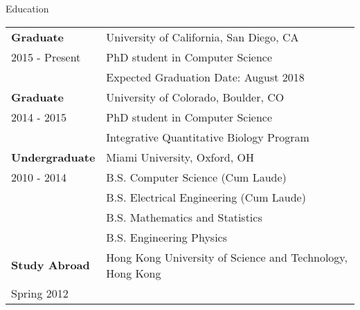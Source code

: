 \documentclass{resume} %
\begin{document}
\begin{rSection}{Education}
  \begin{tabular}{ll}
    \textbf{Graduate}    & University of California, San Diego, CA  \\
    2015 - Present  & PhD student in Computer Science \\
                    & Expected Graduation Date: August 2018\\
    \textbf{Graduate}    & University of Colorado, Boulder, CO \\
    2014 - 2015  & PhD student in Computer Science \\
                    & Integrative Quantitative Biology Program \\
    \textbf{Undergraduate}    & Miami University, Oxford, OH \\
    2010 - 2014   & B.S. Computer Science (Cum Laude)\\
    & B.S. Electrical Engineering (Cum Laude)\\
    & B.S. Mathematics and Statistics \\
    & B.S. Engineering Physics \\
    \textbf{Study Abroad} &  Hong Kong University of Science and Technology, Hong Kong   \\
    Spring 2012 \\
  \end{tabular}
\end{rSection}
\end{document}

